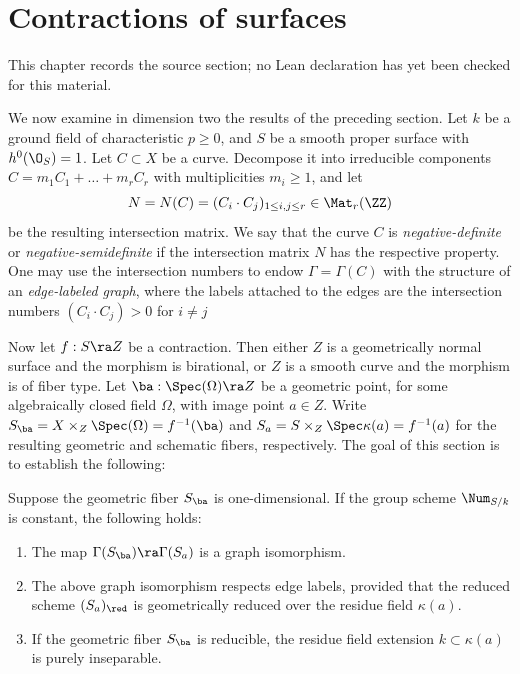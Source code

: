 \chapter{Contractions of surfaces}
\label{no-enriques-surface-over-the-integers-chapter-03}

\begin{remark}
\label{no-enriques-surface-over-the-integers-chapter-03-source}
This chapter records the source section; no Lean declaration has yet been checked for this material.
\notready
\end{remark}

\label{Contractions}

We now examine in dimension two the results of the preceding section.
Let $k$ be a ground field of characteristic $p\geq 0$, and
 $S$ be a smooth proper surface with $h^0(\O_S)=1$.
Let $C\subset X$ be a curve. Decompose it into irreducible components  $C=m_1C_1+\ldots+m_rC_r$ with multiplicities $m_i\geq 1$,
and let
$$
N=N(C)=(C_i\cdot C_j)_{1\leq i,j\leq r}\in\Mat_r(\ZZ)
$$
be the resulting intersection matrix.
We say that the curve $C$ is \emph{negative-definite}  or \emph{negative-semidefinite} if the
intersection matrix $N$ has the respective property.
One may use the intersection numbers  to endow $\Gamma=\Gamma(C)$ with the
structure of an \emph{edge-labeled graph}, where the   labels attached to the edges are the intersection numbers
$(C_i\cdot C_j)>0$ for $i\neq j$

Now let  $f:S\ra Z$ be a
contraction. Then  either $Z$ is a geometrically normal   surface and the morphism is birational,
or $Z$ is a smooth curve and the morphism is of fiber type.
Let $\ba:\Spec(\Omega)\ra Z$ be a geometric point, for some algebraically closed field $\Omega$,
with image point $a\in Z$.
Write $S_\ba=X\times_Z\Spec(\Omega)=f^{-1}(\ba)$ and $S_a=S\times_Z\Spec\kappa(a)=f^{-1}(a)$ for the resulting geometric
and schematic fibers, respectively.
The goal of this section is to establish the following:

\begin{theorem}
\notready
\label{geometric and schematic fiber}
Suppose the geometric fiber $S_\ba$   is one-dimensional.
If the group scheme $\Num_{S/k}$ is constant,   the following holds:
\begin{enumerate}
\item
The map $\Gamma(S_\ba)\ra\Gamma(S_a)$ is a graph isomorphism.
\item
The above graph isomorphism respects edge labels, provided that the  reduced scheme  $(S_a)_\red$
is geometrically reduced  over the residue field $\kappa(a)$.
\item
If the geometric fiber $S_\ba$ is reducible, the residue field extension $k\subset\kappa(a)$ is purely inseparable.
\end{enumerate}
\end{theorem}


